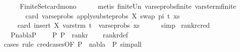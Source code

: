 \begin{isabellebody}
\ \ \ \ \isamarkupfalse%
\ Finite{\isacharunderscore}{\kern0pt}Set{\isachardot}{\kern0pt}card{\isacharunderscore}{\kern0pt}mono\isanewline
\ \ \ \ \isamarkupfalse%
\ {\isacharparenleft}{\kern0pt}metis\ finite{\isacharunderscore}{\kern0pt}Un\ vars{\isacharunderscore}{\kern0pt}eprobs{\isacharunderscore}{\kern0pt}finite\ vars{\isacharunderscore}{\kern0pt}term{\isacharunderscore}{\kern0pt}finite{\isacharparenright}{\kern0pt}\isanewline
\ \ \isamarkupfalse%
\ \isamarkupfalse%
\ \isanewline
\ \ \ \ {\isachardoublequoteopen}card\ {\isacharparenleft}{\kern0pt}vars{\isacharunderscore}{\kern0pt}eprobs\ {\isacharparenleft}{\kern0pt}apply{\isacharunderscore}{\kern0pt}subst{\isacharunderscore}{\kern0pt}eprobs\ {\isacharbrackleft}{\kern0pt}{\isacharparenleft}{\kern0pt}X{\isacharcomma}{\kern0pt}\ swap\ pi\ t{\isacharparenright}{\kern0pt}{\isacharbrackright}{\kern0pt}\ xs{\isacharparenright}{\kern0pt}{\isacharparenright}{\kern0pt}\isanewline
\ \ \ \ {\isacharless}{\kern0pt}\ card\ {\isacharparenleft}{\kern0pt}insert\ X\ {\isacharparenleft}{\kern0pt}vars{\isacharunderscore}{\kern0pt}trm\ t\ {\isasymunion}\ vars{\isacharunderscore}{\kern0pt}eprobs\ xs{\isacharparenright}{\kern0pt}{\isacharparenright}{\kern0pt}{\isachardoublequoteclose}\isanewline
\ \ \ \ \isamarkupfalse%
\ simp\isanewline
{}\isamarkupfalse%
%
\endisatagproof
{\isafoldproof}%
%
\isadelimproof
\isanewline
%
\endisadelimproof
\isanewline
\isanewline
{}\isamarkupfalse%
\ rank{\isacharunderscore}{\kern0pt}r{\isacharunderscore}{\kern0pt}cred{\isacharcolon}{\kern0pt}\ \isanewline
\ \ \ {\isachardoublequoteopen}P{}{\isasymturnstile}{\isacharparenleft}{\kern0pt}nabla{\isacharparenright}{\kern0pt}{\isasymrightarrow}P{}{\isachardoublequoteclose}\ \isanewline
\ \ \ {\isachardoublequoteopen}{\isacharparenleft}{\kern0pt}P{}{\isacharcomma}{\kern0pt}\ P{}{\isacharparenright}{\kern0pt}\ {\isasymin}\ rank{\isacharunderscore}{\kern0pt}r{\isachardoublequoteclose}\isanewline
%
\isadelimproof
\ \ %
\endisadelimproof
%
\isatagproof
{}\isamarkupfalse%
\ rank{\isacharunderscore}{\kern0pt}r{\isacharunderscore}{\kern0pt}def\ \isamarkupfalse%
\ {\isacharparenleft}{\kern0pt}cases\ rule{\isacharcolon}{\kern0pt}\ c{\isacharunderscore}{\kern0pt}red{\isachardot}{\kern0pt}cases{\isacharbrackleft}{\kern0pt}OF\ {\isacartoucheopen}P{}\ {\isasymturnstile}\ nabla\ {\isasymrightarrow}\ P{}{\isacartoucheclose}{\isacharbrackright}{\kern0pt}{\isacharcomma}{\kern0pt}\ simp{\isacharunderscore}{\kern0pt}all{\isacharparenright}{\kern0pt}%

\end{isabellebody}
